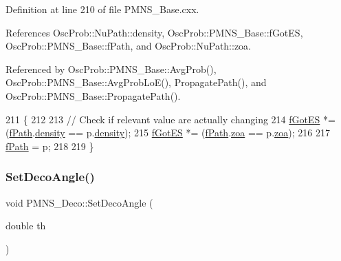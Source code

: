 Definition at line 210 of file P\+M\+N\+S\+\_\+\+Base.\+cxx.



References Osc\+Prob\+::\+Nu\+Path\+::density, Osc\+Prob\+::\+P\+M\+N\+S\+\_\+\+Base\+::f\+Got\+ES, Osc\+Prob\+::\+P\+M\+N\+S\+\_\+\+Base\+::f\+Path, and Osc\+Prob\+::\+Nu\+Path\+::zoa.



Referenced by Osc\+Prob\+::\+P\+M\+N\+S\+\_\+\+Base\+::\+Avg\+Prob(), Osc\+Prob\+::\+P\+M\+N\+S\+\_\+\+Base\+::\+Avg\+Prob\+Lo\+E(), Propagate\+Path(), and Osc\+Prob\+::\+P\+M\+N\+S\+\_\+\+Base\+::\+Propagate\+Path().


\begin{DoxyCode}
211 \{
212 
213   \textcolor{comment}{// Check if relevant value are actually changing}
214   \hyperlink{classOscProb_1_1PMNS__Base_a6dc5cd010d2d70b2324745b4e53e9839}{fGotES} *= (\hyperlink{classOscProb_1_1PMNS__Base_a849437aa8891fe042e86886ce8f81c6e}{fPath}.\hyperlink{structOscProb_1_1NuPath_a54ddd451db69bc54434de3cf18a117ca}{density} == p.\hyperlink{structOscProb_1_1NuPath_a54ddd451db69bc54434de3cf18a117ca}{density});
215   \hyperlink{classOscProb_1_1PMNS__Base_a6dc5cd010d2d70b2324745b4e53e9839}{fGotES} *= (\hyperlink{classOscProb_1_1PMNS__Base_a849437aa8891fe042e86886ce8f81c6e}{fPath}.\hyperlink{structOscProb_1_1NuPath_af3213f3691ba83c6bc05f4a3490f6b31}{zoa} == p.\hyperlink{structOscProb_1_1NuPath_af3213f3691ba83c6bc05f4a3490f6b31}{zoa});
216 
217   \hyperlink{classOscProb_1_1PMNS__Base_a849437aa8891fe042e86886ce8f81c6e}{fPath} = p;
218 
219 \}
\end{DoxyCode}
\mbox{\label{classOscProb_1_1PMNS__Deco_a35e79054682aa88c55f4350c29336014}} 
\subsubsection{\texorpdfstring{Set\+Deco\+Angle()}{SetDecoAngle()}}
{\footnotesize\ttfamily void P\+M\+N\+S\+\_\+\+Deco\+::\+Set\+Deco\+Angle (\begin{DoxyParamCaption}\item[{double}]{th }\end{DoxyParamCaption})\hspace{0.3cm}{\ttfamily [virtual]}}

